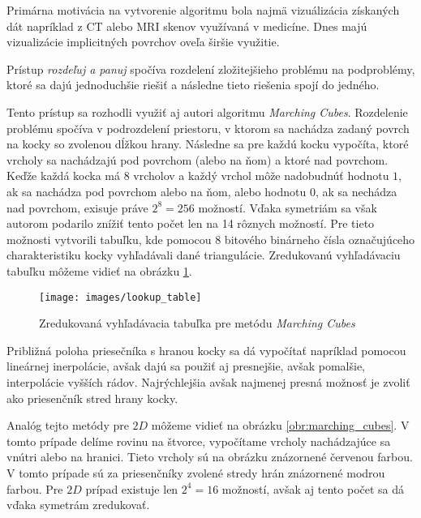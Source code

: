 Primárna motivácia na vytvorenie algoritmu bola najmä vizuálizácia získaných dát napríklad z CT alebo MRI skenov 
využívaná v medicíne. Dnes majú vizualizácie implicitných povrchov oveľa širšie využitie.

Prístup \textit{rozdeľuj a panuj} spočíva rozdelení zložitejšieho problému na podproblémy, 
ktoré sa dajú jednoduchšie riešiť a následne tieto riešenia spojí do jedného.

Tento prístup sa rozhodli využiť aj autori algoritmu \textit{Marching Cubes}. Rozdelenie problému
spočíva v podrozdelení priestoru, v ktorom sa nachádza zadaný povrch na kocky so zvolenou dĺžkou
hrany. Následne sa pre každú kocku vypočíta, ktoré vrcholy sa nachádzajú pod povrchom (alebo na ňom) 
a ktoré nad povrchom. Keďže každá kocka má 8 vrcholov a každý vrchol môže nadobudnúť hodnotu $1$, ak sa 
nachádza pod povrchom alebo na ňom, alebo hodnotu $0$, ak sa nechádza nad povrchom, exisuje práve 
$2^8 = 256$ možností. Vďaka symetriám sa však autorom podarilo znížiť tento počet len na 14 rôznych možností.
Pre tieto možnosti vytvorili tabuľku, kde pomocou 8 bitového binárneho čísla označujúceho charakteristiku
kocky vyhľadávali dané triangulácie. Zredukovanú vyhľadávaciu tabuľku môžeme vidieť na obrázku \ref{obr:lookup_table}.

\begin{figure}
    \centerline{\texttt{[image: images/lookup\_table]}}
    \caption[Zredukovaná vyhľadávacia tabuľka \cite{smistad2012real} pre metódu \textit{Marching Cubes}]{Zredukovaná vyhľadávacia tabuľka \cite{smistad2012real} pre metódu \textit{Marching Cubes}}
    \label{obr:lookup_table}
\end{figure}

Približná poloha priesečníka s hranou kocky sa dá vypočítať napríklad pomocou lineárnej inerpolácie, avšak 
dajú sa použiť aj presnejšie, avšak pomalšie, interpolácie vyšších rádov. Najrýchlejšia avšak najmenej presná
možnosť je zvoliť ako priesenčník stred hrany kocky.

Analóg tejto metódy pre $2D$ môžeme vidieť na obrázku \ref{obr:marching_cubes}. V tomto prípade delíme rovinu na štvorce, 
vypočítame vrcholy nachádzajúce sa vnútri alebo na hranici. Tieto vrcholy sú na obrázku znázornené 
červenou farbou. V tomto prípade sú za priesenčníky zvolené stredy hrán znázornené modrou farbou. 
Pre $2D$ prípad existuje len $2^4 = 16$ možností, avšak aj tento počet sa dá vďaka symetrám zredukovať.


